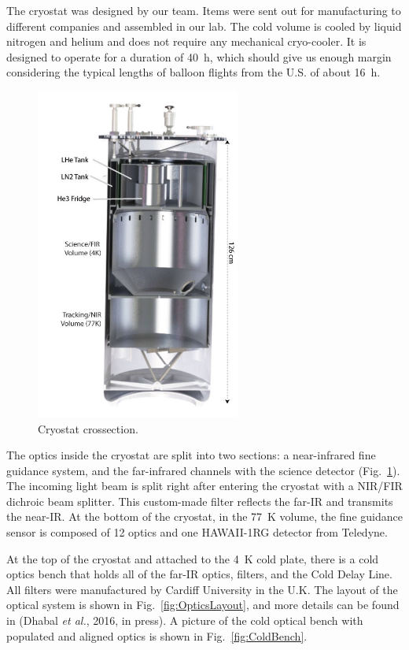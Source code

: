 The cryostat was designed by our team. Items were sent out for manufacturing to different companies and assembled in our lab. The cold volume is cooled by liquid nitrogen and helium and does not require any mechanical cryo-cooler. It is designed to operate for a duration of \SI{40}{\hour}, which should give us enough margin considering the typical lengths of balloon flights from the U.S. of about \SI{16}{\hour}. 

\begin{figure}[!h]
		\centering
		\includegraphics[width=0.6\textwidth]{Figures/Dewar.jpg} 
		\caption[Cryostat crossection]{Cryostat crossection.}
		\label{fig:CryostatCrosssection}
\end{figure}

The optics inside the cryostat are split into two sections: a near-infrared fine guidance system, and the far-infrared channels with the science detector (Fig.~\ref{fig:CryostatCrosssection}). The incoming light beam is split right after entering the cryostat with a NIR/FIR dichroic beam splitter. This custom-made filter reflects the far-IR and transmits the near-IR. At the bottom of the cryostat, in the \SI{77}{\kelvin} volume, the fine guidance sensor is composed of 12 optics and one HAWAII-1RG detector from Teledyne. 


At the top of the cryostat and attached to the \SI{4}{\kelvin} cold plate, there is a cold optics bench that holds all of the far-IR optics, filters, and the Cold Delay Line. All filters were manufactured by Cardiff University in the U.K. The layout of the optical system is shown in Fig.~\ref{fig:OpticsLayout}, and more details can be found in (Dhabal \textit{et al.}, 2016, in press). A picture of the cold optical bench with populated and aligned optics is shown in Fig.~\ref{fig:ColdBench}.

